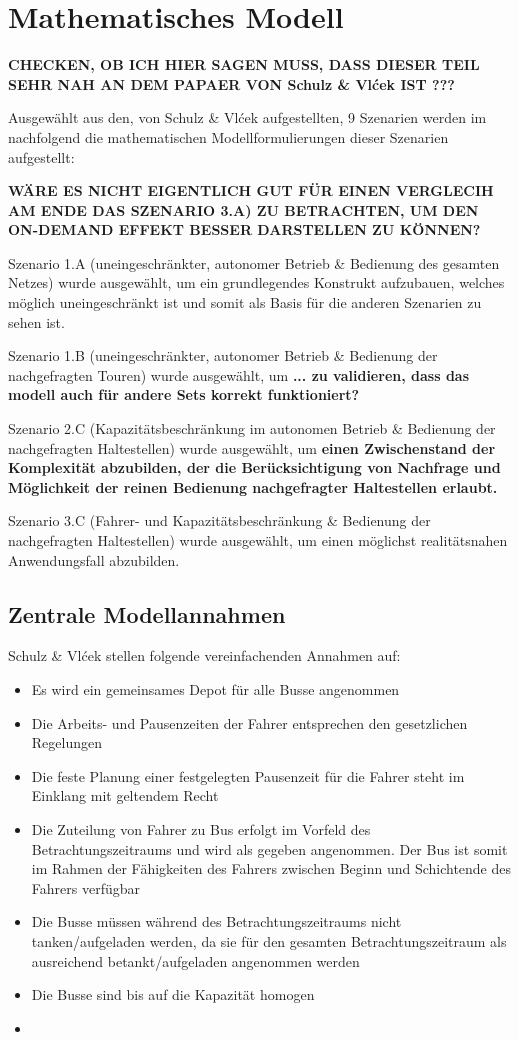 \chapter{Mathematisches Modell}
\label{chapter:4}

\textbf{CHECKEN, OB ICH HIER SAGEN MUSS, DASS DIESER TEIL SEHR NAH AN DEM PAPAER VON Schulz \& Vlćek IST ???}

Ausgewählt aus den, von Schulz \& Vlćek aufgestellten, 9 Szenarien werden im nachfolgend die mathematischen Modellformulierungen dieser Szenarien aufgestellt:

\textbf{WÄRE ES NICHT EIGENTLICH GUT FÜR EINEN VERGLECIH AM ENDE DAS SZENARIO 3.A) ZU BETRACHTEN, UM DEN ON-DEMAND EFFEKT BESSER DARSTELLEN ZU KÖNNEN?}

Szenario 1.A (uneingeschränkter, autonomer Betrieb \& Bedienung des gesamten Netzes) wurde ausgewählt, um ein grundlegendes Konstrukt aufzubauen, welches möglich uneingeschränkt ist und somit als Basis für die anderen Szenarien zu sehen ist.

Szenario 1.B (uneingeschränkter, autonomer Betrieb \& Bedienung der nachgefragten Touren) wurde ausgewählt, um \textbf{... zu validieren, dass das modell auch für andere Sets korrekt funktioniert?}

Szenario 2.C (Kapazitätsbeschränkung im autonomen Betrieb \& Bedienung der nachgefragten Haltestellen) wurde ausgewählt, um  \textbf{einen Zwischenstand der Komplexität abzubilden, der die Berücksichtigung von Nachfrage und Möglichkeit der reinen Bedienung nachgefragter Haltestellen erlaubt.}

Szenario 3.C (Fahrer- und Kapazitätsbeschränkung \& Bedienung der nachgefragten Haltestellen) wurde ausgewählt, um einen möglichst realitätsnahen Anwendungsfall abzubilden.

\section{Zentrale Modellannahmen}
\label{sec:4.1}
Schulz \& Vlćek stellen folgende vereinfachenden Annahmen auf:
\begin{itemize}
    \item Es wird ein gemeinsames Depot für alle Busse angenommen
    \item Die Arbeits- und Pausenzeiten der Fahrer entsprechen den gesetzlichen Regelungen
    \item Die feste Planung einer festgelegten Pausenzeit für die Fahrer steht im Einklang mit geltendem Recht
    \item Die Zuteilung von Fahrer zu Bus erfolgt im Vorfeld des Betrachtungszeitraums und wird als gegeben angenommen. Der Bus ist somit im Rahmen der Fähigkeiten des Fahrers zwischen Beginn und  Schichtende des Fahrers verfügbar
    \item Die Busse müssen während des Betrachtungszeitraums nicht tanken/aufgeladen werden, da sie für den gesamten Betrachtungszeitraum als ausreichend betankt/aufgeladen angenommen werden
    \item Die Busse sind bis auf die Kapazität homogen
    \item 
\end{itemize}


